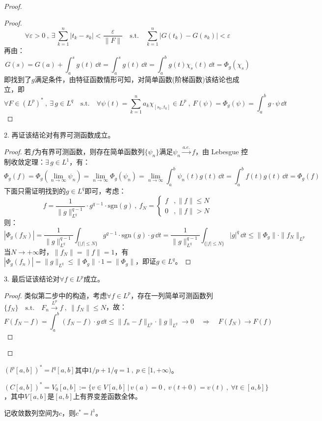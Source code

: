 \begin{proof}
\begin{proof}
\[\forall \varepsilon>0 \ , \ \exists \, \sum_{k=1}^n|t_k-s_k|<\frac{\varepsilon}{\|F\|} \quad \text{s.t.} \quad \sum_{k=1}^n|G(t_k)-G(s_k)|<\varepsilon\]
再由：
\[G(s)=G(a)+\int_a^sg(t) \, \dd t=\int_a^sg(t) \, \dd t=\int_a^bg(t)\chi_s(t) \, \dd t=\Phi_g(\chi_s)\]
即找到了$g$满足条件，由特征函数情形可知，对简单函数(阶梯函数)该结论也成立，即
\[\forall F \in (L^p)^* \ , \ \exists \, g \in L^q \quad \text{s.t.} \quad \forall \psi(t)=\sum_{k=1}^{n}a_k\chi_{[s_k,t_k]} \in L^p \ , \ F(\psi)=\Phi_g(\psi)=\int_a^bg \cdot \psi \, \dd t\]
\end{proof}
\begin{proposition}
2. 再证该结论对有界可测函数成立。
\end{proposition}
\begin{proof}
若$f$为有界可测函数，则存在简单函数列$\{\psi_n\}$满足$\psi_n \xrightarrow{a.e.} f$，由 Lebesgue 控制收敛定理：$\exists \, g \in L^1$，有：
\[\Phi_g(f)=\Phi_g\left(\lim_{n \to \infty}\psi_n\right)=\lim_{n \to \infty}\Phi_g(\psi_n)=\lim_{n \to \infty}\int_a^b\psi_n(t)g(t) \, \dd t=\int_a^bf(t)g(t) \, \dd t=\Phi_g(f)\]
下面只需证明找到的$g \in L^q$即可，考虑：
\[f=\frac{1}{\|g\|_{L^q}^{q-1}} \cdot g^{q-1} \cdot \text{sgn}(g) \ , \ f_N=\left\{
    \begin{array}{ll}
        f & ,\|f\| \leq N \\ 0 & ,\|f\|>N
    \end{array}
\right.\]
则：
\[|\Phi_g(f_N)|=\frac{1}{\|g\|_{L^q}^{q-1}}\int_{\{|f| \leq N\}}g^{q-1} \cdot \text{sgn}(g) \cdot g \, \dd t=\frac{1}{\|g\|_{L^q}^{q-1}}\int_{\{|f| \leq N\}}|g|^q \, \dd t \leq \|\Phi_g\| \cdot \|f_N\|_{L^p}\]
当$N \to +\infty$时，$\|f_N\|=\|f\|=1$，有$|\Phi_g(f_n)|=\|g\|_{L^q} \leq \|\Phi_g\| \cdot 1 = \|\Phi_g\|$，即证$g \in L^q$。
\end{proof}
\begin{proposition}
3. 最后证该结论对$\forall f \in L^p$成立。
\end{proposition}
\begin{proof}
类似第二步中的构造，考虑$\forall f \in L^p$，存在一列简单可测函数列$\{f_N\} \quad \text{s.t.} \quad F_n \xrightarrow{L^p} f \ , \ \|f_N\| \leq N$，故：
\[F(f_N-f)=\int_a^b(f_N-f) \cdot g \, \dd t \leq \|f_n-f\|_{L^p} \cdot \|g\|_{L^q} \to 0 \quad \Rightarrow \quad F(f_N) \to F(f)\]
\end{proof}
\end{proof}

\begin{example}
\quad $(l^p[a,b])^*=l^q[a,b]$其中$1/p+1/q=1 \ , \ p \in [1,+\infty)$。
\end{example}
\begin{example}
\quad $(C[a,b])^*=V_0[a,b]:=\{v \in V[a,b] \, | \, v(a)=0 \ , \ v(t+0)=v(t) \ , \ \forall t \in [a,b]\}$，其中$V[a,b]$是$[a,b]$上有界变差函数全体。
\end{example}
\begin{example}
\quad 记收敛数列空间为$c$，则$c^*=l^1$。
\end{example}

